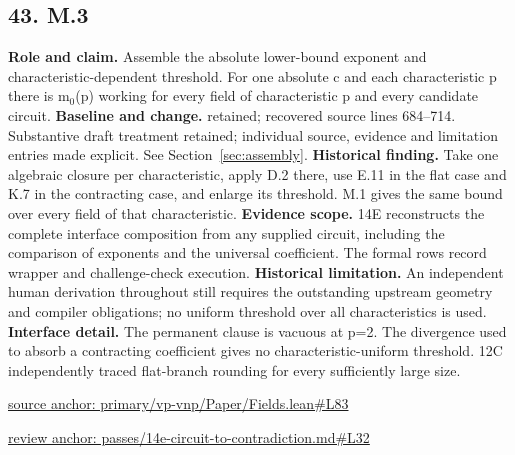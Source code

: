 \documentclass[11pt,letterpaper]{article}
\theoremstyle{definition}\newtheorem{definition}[theorem]{Definition}\newtheorem{example}[theorem]{Example}
\theoremstyle{remark}\newtheorem{remark}[theorem]{Remark}
\begin{document}
\subsection*{43. M.3}
\textbf{Role and claim.} Assemble the absolute lower-bound exponent and characteristic-dependent threshold. For one absolute c and each characteristic p there is m\ensuremath{{}_0}(p) working for every field of characteristic p and every candidate circuit.
\textbf{Baseline and change.} retained; recovered source lines 684--714. Substantive draft treatment retained; individual source, evidence and limitation entries made explicit. See Section~\ref{sec:assembly}.
\textbf{Historical finding.} Take one algebraic closure per characteristic, apply D.2 there, use E.11 in the flat case and K.7 in the contracting case, and enlarge its threshold. M.1 gives the same bound over every field of that characteristic.
\textbf{Evidence scope.} 14E reconstructs the complete interface composition from any supplied circuit, including the comparison of exponents and the universal coefficient. The formal rows record wrapper and challenge-check execution.
\textbf{Historical limitation.} An independent human derivation throughout still requires the outstanding upstream geometry and compiler obligations; no uniform threshold over all characteristics is used.
\textbf{Interface detail.} The permanent clause is vacuous at p=2. The divergence used to absorb a contracting coefficient gives no characteristic-uniform threshold. 12C independently traced flat-branch rounding for every sufficiently large size.
\par\href{https://github.com/nousentllc/VP-VNP-Review/blob/8a7976933b6b2b4ffda1ad3a0dfb5fc6b6f023e8/primary/vp-vnp/Paper/Fields.lean\#L83}{source anchor: primary/vp-vnp/Paper/Fields.lean\#L83}
\par\href{https://github.com/nousentllc/VP-VNP-Review/blob/8a7976933b6b2b4ffda1ad3a0dfb5fc6b6f023e8/passes/14e-circuit-to-contradiction.md\#L32}{review anchor: passes/14e-circuit-to-contradiction.md\#L32}
\goodbreak
\end{document}
